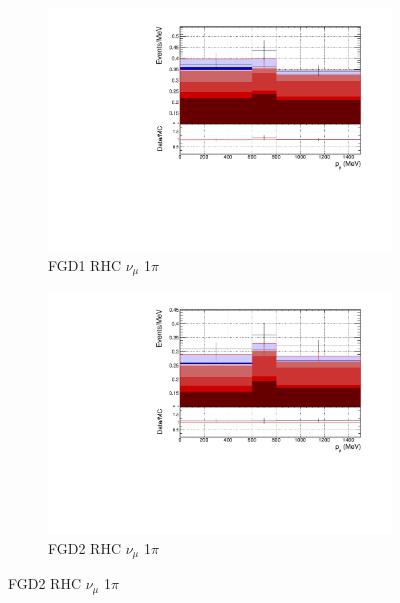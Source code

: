 \begin{figure}[!h]
\begin{subfigure}{0.49\textwidth}
  \centering
  \includegraphics[width=\textwidth]{figs/FGD1_NuMuBkg_CC1pi_in_AntiNu_Mode_p}
  \caption{FGD1 RHC $\nu_{\mu}$ 1$\pi$}
\end{subfigure}
\begin{subfigure}{0.49\textwidth}
  \centering
  \includegraphics[width=\textwidth]{figs/FGD2_NuMuBkg_CC1pi_in_AntiNu_Mode_p}
  \caption{FGD2 RHC $\nu_{\mu}$ 1$\pi$}
\end{subfigure}


\end{figure}
